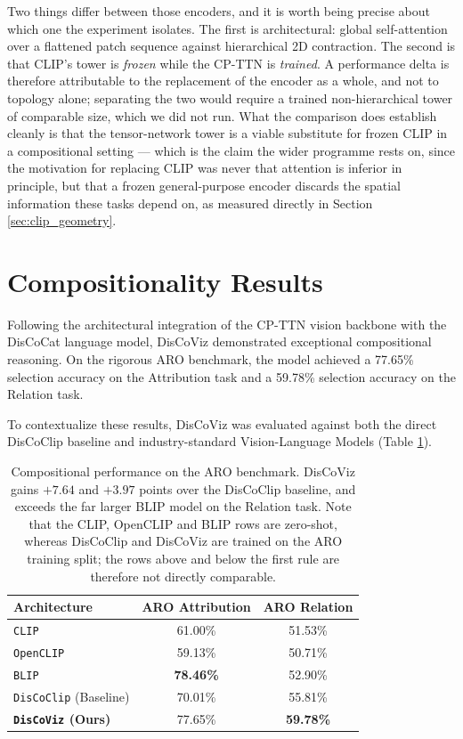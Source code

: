 \documentclass[12pt, a4paper, oneside]{report}
\begin{document}
Two things differ between those encoders, and it is worth being precise about which one the experiment isolates. The first is architectural: global self-attention over a flattened patch sequence against hierarchical 2D contraction. The second is that CLIP's tower is \textit{frozen} while the CP-TTN is \textit{trained}. A performance delta is therefore attributable to the replacement of the encoder as a whole, and not to topology alone; separating the two would require a trained non-hierarchical tower of comparable size, which we did not run. What the comparison does establish cleanly is that the tensor-network tower is a viable substitute for frozen CLIP in a compositional setting --- which is the claim the wider programme rests on, since the motivation for replacing CLIP was never that attention is inferior in principle, but that a frozen general-purpose encoder discards the spatial information these tasks depend on, as measured directly in Section \ref{sec:clip_geometry}.

\section{Compositionality Results}

Following the architectural integration of the CP-TTN vision backbone with the DisCoCat language model, DisCoViz demonstrated exceptional compositional reasoning. On the rigorous ARO benchmark, the model achieved a 77.65\% selection accuracy on the Attribution task and a 59.78\% selection accuracy on the Relation task. 

To contextualize these results, DisCoViz was evaluated against both the direct DisCoClip baseline and industry-standard Vision-Language Models (Table \ref{tab:aro_results}).

\begin{table}[hbt!]
    \centering
    \begin{tabular}{l c c}
        \toprule
        \textbf{Architecture} & \textbf{ARO Attribution} & \textbf{ARO Relation} \\
        \midrule
        \texttt{CLIP} \cite{radford2021learning} & 61.00\% & 51.53\% \\
        \texttt{OpenCLIP} & 59.13\% & 50.71\% \\
        \texttt{BLIP} & \textbf{78.46\%} & 52.90\% \\
        \midrule
        \texttt{DisCoClip} (Baseline) & 70.01\% & 55.81\% \\
        \textbf{\texttt{DisCoViz} (Ours)} & 77.65\% & \textbf{59.78\%} \\
        \bottomrule
    \end{tabular}
    \caption{Compositional performance on the ARO benchmark. DisCoViz gains $+7.64$ and $+3.97$ points over the DisCoClip baseline, and exceeds the far larger BLIP model on the Relation task. Note that the CLIP, OpenCLIP and BLIP rows are zero-shot, whereas DisCoClip and DisCoViz are trained on the ARO training split; the rows above and below the first rule are therefore not directly comparable.}
    \label{tab:aro_results}
\end{table}
\end{document}
